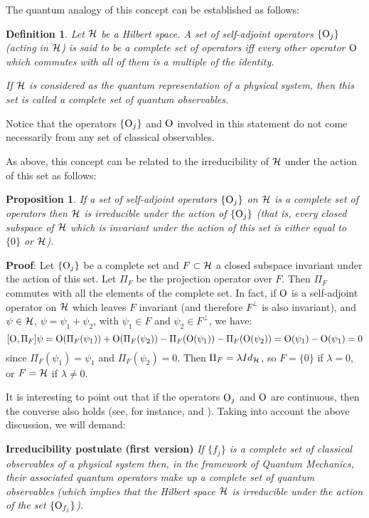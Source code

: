 \documentclass[12pt]{article}
\theoremstyle{plain}
\newtheorem{prop}{Proposition}
\newtheorem{definition}{Definition}
\def\qed{\ifvmode\removelastskip\fi
{\unskip\nobreak\hfil\penalty50\hbox{}\nobreak\hfil
\hbox{\vrule height1.2ex width1.2ex}\parfillskip=0pt
\finalhyphendemerits=0 \par\smallskip}}
\def\H{{\cal H}}
\def\Op{{\rm O}}
\begin{document}
The quantum analogy of this concept can be established as follows:

\begin{definition}
Let $\H$ be a Hilbert space.
A set of self-adjoint operators $\{ \Op_j \}$ (acting in $\H$)
is said to be a {\rm complete set of operators}
iff every other operator $\Op$ which commutes with
all of them is a multiple of the identity.

If $\H$ is considered as the quantum representation of
a physical system, then this set is called a
{\rm complete set of quantum observables}.
\end{definition}

Notice that the operators $\{ \Op_j \}$ and $\Op$
involved in this statement do not come necessarily
 from any set of classical observables.

As above, this concept can be  related to the irreducibility of $\H$
under
the action of this set as follows:

\begin{prop}
If a set of self-adjoint operators
$\{ \Op_j \}$ on $\H$ is a complete set of operators
then $\H$ is irreducible under the action of $\{ \Op_j \}$
(that is, every closed subspace of $\H$ which is invariant
under the action of this set is either equal to $\{ 0 \}$ or $\H$).
\end{prop}
{\bf Proof}: 
Let $\{ \Op_j \}$ be a complete set and $F \subset \H$
a closed subspace invariant under the action
of this set. Let $\Pi_F$ be the projection operator
over $F$. Then $\Pi_F$ commutes with all the elements of
the complete set. In fact, if $\Op$ is a self-adjoint operator on $\H$
which leaves $F$ invariant (and therefore $F^\perp$ is also invariant),
and $\psi \in \H$, $\psi = \psi_1+\psi_2$,
with $\psi_1 \in F$ and $\psi_2 \in F^\perp$, we have:
$$
[\Op ,\Pi_F]\psi =
\Op (\Pi_F (\psi_1))+\Op (\Pi_F (\psi_2))-
\Pi_F(\Op (\psi_1))-\Pi_F(\Op (\psi_2)) =
\Op (\psi_1) -\Op (\psi_1) = 0
$$
since $\Pi_F (\psi_1) = \psi_1$ and $\Pi_F (\psi_2) = 0$.
Then $\Pi_F=\lambda Id_{\H}$, so $F=\{ 0\}$ if $\lambda =0$,
or $F=\H$ if $\lambda\not= 0$.
\qed

It is interesting to point out that if the operators
$\Op_j$ and $\Op$ are continuous, then the converse also holds
(see, for instance, \cite{Dd-ea} and \cite{La-ra}).
Taking into account the above discussion, we will demand:
\medskip

\noindent
{\bf Irreducibility postulate (first version)}
{\it If $\{ f_j \}$ is a complete set of classical observables
of a physical system then, in the framework of Quantum Mechanics,
their associated quantum operators make up a complete set of quantum
observables
(which implies that the Hilbert space $\H$ is irreducible
under the action of the set $\{ \Op_{f_j} \}$).}
\end{document}
